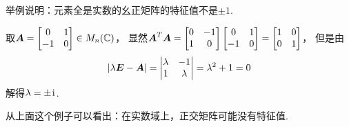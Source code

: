 \begin{example}
举例说明：元素全是实数的幺正矩阵的特征值不是\(\pm1\).
\begin{solution}
取\(\boldsymbol{A}
= \begin{bmatrix}
	0 & 1 \\
	-1 & 0
\end{bmatrix} \in M_n(\mathbb{C})\)，
显然\(\boldsymbol{A}^T \boldsymbol{A}
= \begin{bmatrix}
	0 & -1 \\
	1 & 0
\end{bmatrix}
\begin{bmatrix}
	0 & 1 \\
	-1 & 0
\end{bmatrix}
= \begin{bmatrix}
	1 & 0 \\
	0 & 1
\end{bmatrix}\)，
但是由\begin{equation*}
	\abs{\lambda\boldsymbol{E}-\boldsymbol{A}}
	= \begin{vmatrix}
		\lambda & -1 \\
		1 & \lambda
	\end{vmatrix}
	= \lambda^2 + 1
	= 0
\end{equation*}解得\(\lambda=\pm\kern1pt\mathrm{i}\kern1pt\).
\end{solution}
\end{example}
\begin{remark}
从上面这个例子可以看出：在实数域上，正交矩阵可能没有特征值.
\end{remark}
